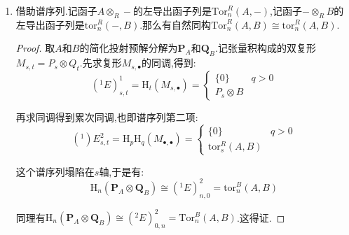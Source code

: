 \begin{enumerate}
\begin{proof}
		于是为证$n+1$的情况,只需反复带入$X\cong Y$,结合$n=1$已经得证:
		$$\mathrm{tor}_{n+1}(A,B)\cong\mathrm{tor}_1(K_{-1},V_{n-1})$$
		$$\mathrm{Tor}_{1}(K_{-1},V_{n-1})\cong\mathrm{tor}_1(K_{0},V_{n-2})$$
		$$\mathrm{Tor}_{1}(K_0,V_{n-2})\cong\mathrm{tor}_1(K_{1},V_{n-3})$$
		$$\cdots$$
		$$\mathrm{Tor}_{1}(K_{n-2},V_0)\cong\mathrm{tor}_1(K_{n-1},V_{-1})$$
		$$\mathrm{Tor}_{1}(K_{n-1},V_{-1})\cong\mathrm{Tor}_{n+1}(A,B)$$
	\end{proof}
    \item 借助谱序列.记函子$A\otimes_R-$的左导出函子列是$\mathrm{Tor}_n^R(A,-)$,记函子$-\otimes_RB$的左导出函子列是$\mathrm{tor}_n^R(-,B)$.那么有自然同构$\mathrm{Tor}_n^R(A,B)\cong\mathrm{tor}_n^R(A,B)$.
    \begin{proof}
    	
    	取$A$和$B$的简化投射预解分解为$\textbf{P}_A$和$\textbf{Q}_B$.记张量积构成的双复形$M_{s,t}=P_s\otimes Q_t$.先求复形$M_{s,\bullet}$的同调,得到:
    	$$(^1E)^1_{s,t}=\mathrm{H}_t(M_{s,\bullet})=\left\{\begin{array}{cc}\{0\}&q>0\\P_s\otimes B\end{array}\right.$$
    	
    	再求同调得到累次同调,也即谱序列第二项:
    	$$(^1)E^2_{s,t}=\mathrm{H}_p\mathrm{H}_q(M_{\bullet,\bullet})=\left\{\begin{array}{cc}\{0\}&q>0\\\mathrm{tor}_s^R(A,B)\end{array}\right.$$
    
        这个谱序列塌陷在$s$轴,于是有:
        $$\mathrm{H}_n(\textbf{P}_A\otimes\textbf{Q}_B)\cong(^1E)^2_{n,0}=\mathrm{tor}_n^B(A,B)$$
    
        同理有$\mathrm{H}_n(\textbf{P}_A\otimes\textbf{Q}_B)\cong(^2E)^2_{0,n}=\mathrm{Tor}_n^B(A,B)$.这得证.
\end{proof}
\end{enumerate}

